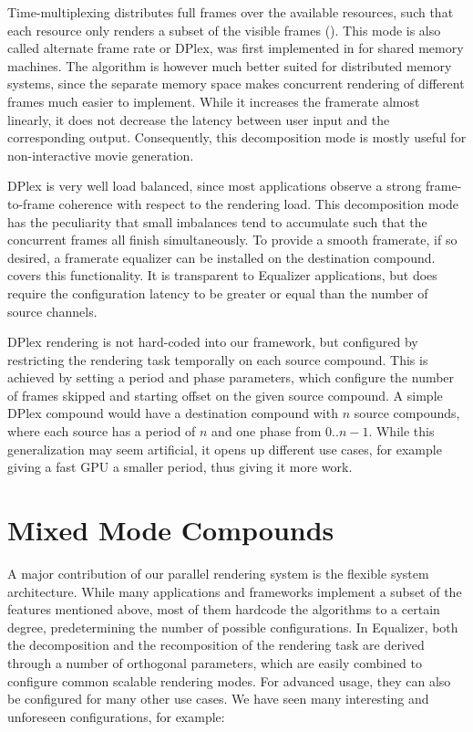 Time-multiplexing distributes full frames over the available resources, such
that each resource only renders a subset of the visible frames ().
This mode is also called alternate frame rate or DPlex, was first implemented in
\cite{BRE:05} for shared memory machines. The algorithm is however much better
suited for distributed memory systems, since the separate memory space makes
concurrent rendering of different frames much easier to implement. While it
increases the framerate almost linearly, it does not decrease the latency
between user input and the corresponding output. Consequently, this
decomposition mode is mostly useful for non-interactive movie generation.

DPlex is very well load balanced, since most applications observe a strong
frame-to-frame coherence with respect to the rendering load. This decomposition
mode has the peculiarity that small imbalances tend to accumulate such that the
concurrent frames all finish simultaneously. To provide a smooth framerate, if
so desired, a framerate equalizer can be installed on the destination compound.
 covers this functionality. It is transparent to
\textsf{Equalizer} applications, but does require the configuration latency to
be greater or equal than the number of source channels.

DPlex rendering is not hard-coded into our framework, but configured by
restricting the rendering task temporally on each source compound. This is
achieved by setting a \textsf{period} and \textsf{phase} parameters, which
configure the number of frames skipped and starting offset on the given source
compound. A simple DPlex compound would have a destination compound with $n$
source compounds, where each source has a period of $n$ and one phase from
$0..n-1$. While this generalization may seem artificial, it opens up different
use cases, for example giving a fast GPU a smaller period, thus giving it more
work.

\section{Mixed Mode Compounds}

A major contribution of our parallel rendering system is the flexible system
architecture. While many applications and frameworks implement a subset of the
features mentioned above, most of them hardcode the algorithms to a certain
degree, predetermining the number of possible configurations. In Equalizer, both
the decomposition and the recomposition of the rendering task are derived
through a number of orthogonal parameters, which are easily combined to
configure common scalable rendering modes. For advanced usage, they can also be
configured for many other use cases. We have seen many interesting and
unforeseen configurations, for example:

